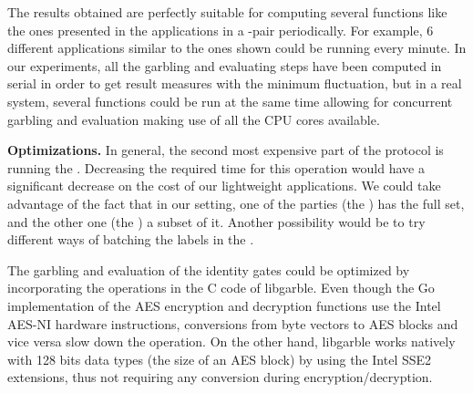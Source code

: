 The results obtained are perfectly suitable for computing several functions
like the ones presented in the applications in a \broker-\garbler pair
periodically.  For example, 6 different applications similar to the ones shown
could be running every minute.  In our experiments, all the garbling and
evaluating steps have been computed in serial in order to get result measures
with the minimum fluctuation, but in a real system, several functions could be
run at the same time allowing for concurrent garbling and evaluation making use
of all the CPU cores available.

\noindent\textbf{Optimizations.} In general, the second most expensive part of
the protocol is running the \PSI.  Decreasing the required time for this
operation would have a significant decrease on the cost of our lightweight
applications.  We could take advantage of the fact that in our \PSI setting,
one of the parties (the \garbler) has the full set, and the other one (the
\broker) a subset of it.  Another possibility would be to try different ways of
batching the labels in the \PSI.

The garbling and evaluation of the identity gates could be optimized by
incorporating the operations in the C code of libgarble.  Even though the
Go implementation of the AES encryption and decryption functions use the
Intel AES-NI hardware instructions, conversions from byte vectors to AES blocks
and vice versa slow down the operation.  On the other hand, libgarble works
natively with 128 bits data types (the size of an AES block) by using the Intel
SSE2 extensions, thus not requiring any conversion during
encryption/decryption.

